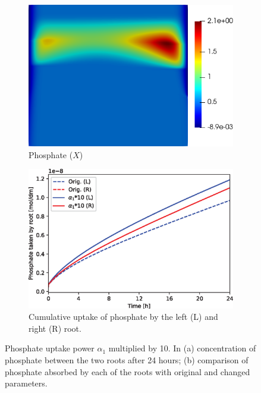 \documentclass[11pt]{article}
\numberwithin{equation}{section}
\begin{document}
\begin{figure}[!htb]
\centering
\begin{subfigure}[t]{0.35\textwidth}
    \includegraphics[width=\textwidth]{Figures/X_alpha1times10.png}
    \caption{Phosphate ($X$)}
    \label{fig:numexp_a1_up1}
\end{subfigure}
\hspace{1cm}
\begin{subfigure}[t]{0.45\textwidth}
    \includegraphics[width=\textwidth]{Figures/alpha1times10.eps}
    \caption{Cumulative uptake of phosphate by the left (L) and right (R) root.}
    \label{fig:numexp_a1_up2}
\end{subfigure}
\caption{Phosphate uptake power $\alpha_1$ multiplied by 10. In (a) concentration of phosphate between the two roots after 24 hours; (b) comparison of phosphate absorbed by each of the roots with original and changed parameters.}
\label{fig:numexp_a1_up}
\end{figure}
\end{document}
